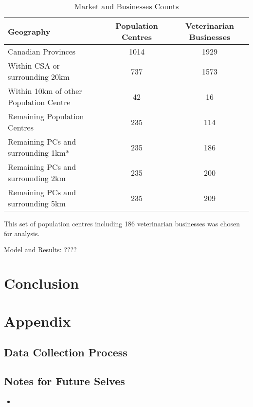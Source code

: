 \documentclass[a4paper,11pt]{article}
\begin{document}
\begin{table}[h]  
\begin{threeparttable}
\caption{Market and Businesses Counts} %
\centering %
\begin{tabular}{l c c } %
\hline\hline   
 Geography & Population Centres & Veterinarian Businesses   
\\ [0.5ex]  
\hline   
Canadian Provinces & 1014 & 1929 \\
Within CSA or surrounding 20km & 737 & 1573 \\
Within 10km of other Population Centre & 42 & 16 \\
Remaining Population Centres & 235 & 114 \\

Remaining PCs and surrounding 1km* & 235 & 186 \\

Remaining PCs and surrounding 2km  & 235 & 200 \\

Remaining PCs and surrounding 5km  & 235 & 209 \\

\hline %
\end{tabular}  
\begin{tablenotes}
    \small  *This set of population centres including 186 veterinarian businesses was chosen for analysis. 
\end{tablenotes}
\end{threeparttable}
\end{table}  

Model and Results: ????

\section{Conclusion}


\newpage
\printbibliography

\newpage
\section*{Appendix}
\subsection*{Data Collection Process}

\subsection*{Notes for Future Selves}
\begin{itemize}
    \item 
\end{itemize}
\end{document}
